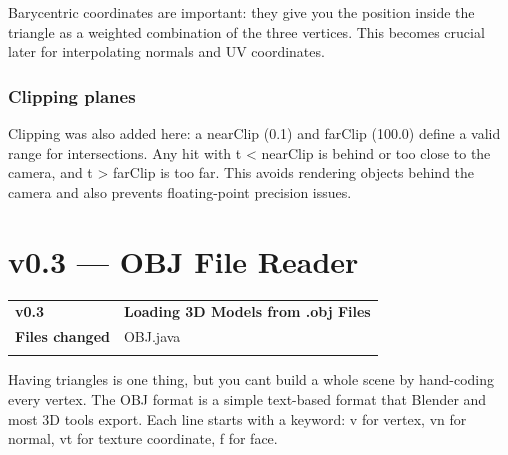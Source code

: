 \documentclass[
]{article}
\newcounter{none} %
\begin{document}
Barycentric coordinates are important: they give you the position inside
the triangle as a weighted combination of the three vertices. This
becomes crucial later for interpolating normals and UV coordinates.

\subsubsection{\texorpdfstring{\textbf{Clipping
planes}}{Clipping planes}}\label{clipping-planes}

Clipping was also added here: a nearClip (0.1) and farClip (100.0)
define a valid range for intersections. Any hit with t \textless{}
nearClip is behind or too close to the camera, and t \textgreater{}
farClip is too far. This avoids rendering objects behind the camera and
also prevents floating-point precision issues.

\section{\texorpdfstring{\textbf{v0.3 --- OBJ File
Reader}}{v0.3 --- OBJ File Reader}}\label{v0.3-obj-file-reader}

{\def\LTcaptype{none} %
\begin{longtable}[]{@{}
  >{\raggedright\arraybackslash}p{}
  >{\raggedright\arraybackslash}p{}@{}}
\toprule\noalign{}
\begin{minipage}[b]{\linewidth}\raggedright
\textbf{v0.3}
\end{minipage} & \begin{minipage}[b]{\linewidth}\raggedright
\textbf{Loading 3D Models from .obj Files}
\end{minipage} \\
\begin{minipage}[b]{\linewidth}\raggedright
\textbf{Files changed}
\end{minipage} & \begin{minipage}[b]{\linewidth}\raggedright
OBJ.java
\end{minipage} \\
\midrule\noalign{}
\endhead
\bottomrule\noalign{}
\endlastfoot
\end{longtable}
}

Having triangles is one thing, but you can\textquotesingle t build a
whole scene by hand-coding every vertex. The OBJ format is a simple
text-based format that Blender and most 3D tools export. Each line
starts with a keyword: v for vertex, vn for normal, vt for texture
coordinate, f for face.
\end{document}
